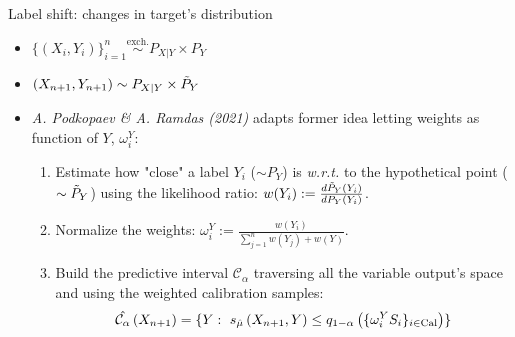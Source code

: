 \documentclass{beamer}
\newcommand{\Ca}{\mathcal{C}_{\alpha}}
\renewcommand{\a}{\alpha}
\begin{document}
\begin{frame}{Label shift: changes in target’s distribution}
    \begin{itemize}%
        \item $\{\left(X_i, Y_i\right)\}_{i=1}^n \overset{\mathrm{exch.}}{\sim} P_{X|Y}\times P_{Y}$
        \item $\left(X_{n+1}, Y_{n+1}\right) \sim P_{X|Y}\times \Tilde{P}_{Y}$
        \item \textit{A. Podkopaev \& A. Ramdas (2021)} %
        adapts former idea letting weights as function of $Y$, $\omega_i^Y$:
        \begin{enumerate}  
            \item Estimate how "close" a label $Y_i$ ($\sim P_Y$) is \textit{w.r.t.} to the hypothetical point ($\sim \Tilde{P}_Y$) using the likelihood ratio: $w(Y_i):= \frac{d\Tilde{P}_Y(Y_i)}{dP_Y(Y_i)}$.
            \item Normalize the weights: $\omega_i^Y:=\frac{w(Y_i)}{\sum_{j=1}^{n} w(Y_j) + w(Y)}$. 
            \item Build the predictive interval $\Ca$ traversing all the variable output's space and using the weighted calibration samples:
            \begin{equation*}\label{eq:cp-label}
                \Hat{\Ca}\left(X_{n+1}\right) = \{ Y: \ s_{\Hat{\mu}}\left(X_{n+1}, Y\right) \leq q_{1-\a}\left(\{\omega^Y_i S_i\}_{i\in\rm{Cal}}\right)  \}
            \end{equation*}
        \end{enumerate}
    \end{itemize}
\end{frame}

\end{document}
